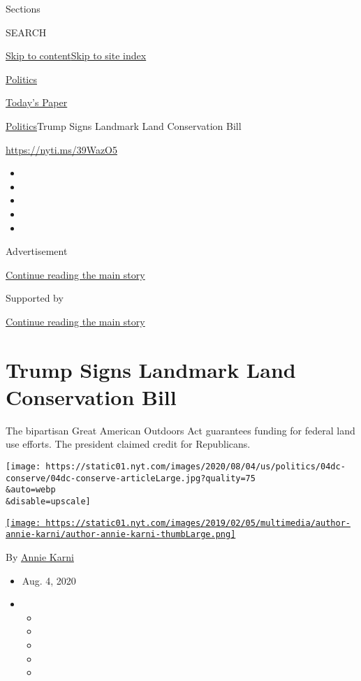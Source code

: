 Sections

SEARCH

\protect\hyperlink{site-content}{Skip to
content}\protect\hyperlink{site-index}{Skip to site index}

\href{https://www.nytimes.com/section/politics}{Politics}

\href{https://myaccount.nytimes.com/auth/login?response_type=cookie\&client_id=vi}{}

\href{https://www.nytimes.com/section/todayspaper}{Today's Paper}

\href{/section/politics}{Politics}\textbar{}Trump Signs Landmark Land
Conservation Bill

\url{https://nyti.ms/39WazO5}

\begin{itemize}
\item
\item
\item
\item
\item
\end{itemize}

Advertisement

\protect\hyperlink{after-top}{Continue reading the main story}

Supported by

\protect\hyperlink{after-sponsor}{Continue reading the main story}

\hypertarget{trump-signs-landmark-land-conservation-bill}{%
\section{Trump Signs Landmark Land Conservation
Bill}\label{trump-signs-landmark-land-conservation-bill}}

The bipartisan Great American Outdoors Act guarantees funding for
federal land use efforts. The president claimed credit for Republicans.

\texttt{[image: https://static01.nyt.com/images/2020/08/04/us/politics/04dc-conserve/04dc-conserve-articleLarge.jpg?quality=75\\\&auto=webp\\\&disable=upscale]}

\href{https://www.nytimes.com/by/annie-karni}{\texttt{[image: https://static01.nyt.com/images/2019/02/05/multimedia/author-annie-karni/author-annie-karni-thumbLarge.png]}}

By \href{https://www.nytimes.com/by/annie-karni}{Annie Karni}

\begin{itemize}
\item
  Aug. 4, 2020
\item
  \begin{itemize}
  \item
  \item
  \item
  \item
  \item
  \end{itemize}
\end{itemize}

